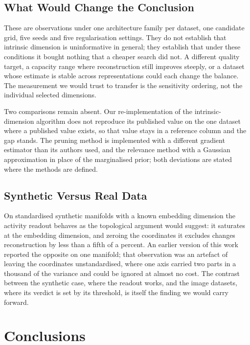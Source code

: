 \documentclass[make,article,submit,pdftex,moreauthors]{Definitions/mdpi}
\begin{document}
\subsection{What Would Change the Conclusion}\label{sec:disc_limits}

These are observations under one architecture family per dataset, one
candidate grid, five seeds and five regularisation settings. They do not
establish that intrinsic dimension is uninformative in general; they
establish that under these conditions it bought nothing that a cheaper
search did not. A different quality target, a capacity range where
reconstruction still improves steeply, or a dataset whose estimate is
stable across representations could each change the balance. The
measurement we would trust to transfer is the sensitivity ordering, not
the individual selected dimensions.

Two comparisons remain absent. Our re-implementation of the
intrinsic-dimension algorithm does not reproduce its published value on
the one dataset where a published value exists, so that value stays in a
reference column and the gap stands. The pruning method is implemented
with a different gradient estimator than its authors used, and the
relevance method with a Gaussian approximation in place of the
marginalised prior; both deviations are stated where the methods are
defined.

\subsection{Synthetic Versus Real Data}\label{sec:disc_synth}

On standardised synthetic manifolds with a known embedding dimension the
activity readout behaves as the topological argument would suggest: it
saturates at the embedding dimension, and zeroing the coordinates it
excludes changes reconstruction by less than a fifth of a percent. An
earlier version of this work reported the opposite on one manifold; that
observation was an artefact of leaving the coordinates unstandardised,
where one axis carried two parts in a thousand of the variance and could
be ignored at almost no cost. The contrast between the synthetic case,
where the readout works, and the image datasets, where its verdict is set
by its threshold, is itself the finding we would carry forward.

\section{Conclusions}\label{sec:conclusion}
\end{document}
